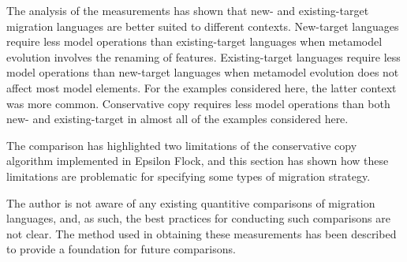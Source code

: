 The analysis of the measurements has shown that new- and existing-target migration languages are better suited to different contexts. New-target languages require less model operations than existing-target languages when metamodel evolution involves the renaming of features. Existing-target languages require less model operations than new-target languages when metamodel evolution does not affect most model elements. For the examples considered here, the latter context was more common. Conservative copy requires less model operations than both new- and existing-target in almost all of the examples considered here.

The comparison has highlighted two limitations of the conservative copy algorithm implemented in Epsilon Flock, and this section has shown how these limitations are problematic for specifying some types of migration strategy. 

The author is not aware of any existing quantitive comparisons of migration languages, and, as such, the best practices for conducting such comparisons are not clear. The method used in obtaining these measurements has been described to provide a foundation for future comparisons. 
